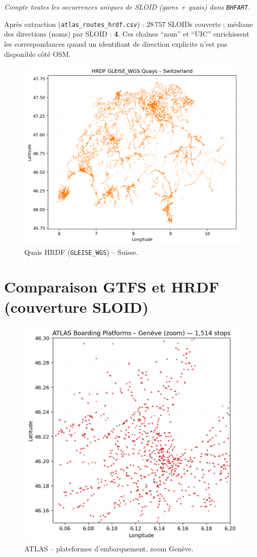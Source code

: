 \noindent\textit{Compte toutes les occurrences uniques de SLOID (gares + quais) dans \texttt{BHFART}.}

\noindent
Après extraction (\texttt{atlas\_routes\_hrdf.csv}) : \textbf{\(28\,757\)} SLOIDs couverts ; médiane des directions (noms) par SLOID : \textbf{4}. Ces chaînes \enquote{nom} et \enquote{UIC} enrichissent les correspondances quand un identifiant de direction explicite n’est pas disponible côté OSM.

\begin{figure}[H]
  \centering
  \includegraphics[width=.76\linewidth]{figures/plots/hrdf_quays_switzerland.png}
  \caption[Quais HRDF – Suisse]{Quais HRDF (\texttt{GLEISE\_WGS}) – Suisse.}
\end{figure}


\section{Comparaison GTFS et HRDF (couverture SLOID)}

\begin{figure}[H]
  \centering
  \includegraphics[width=.7\linewidth]{figures/plots/atlas_points_geneva.png}
  \caption[ATLAS – Genève]{ATLAS – plateformes d'embarquement, zoom Genève.}
  \label{fig:atlas_geneva}
\end{figure}


